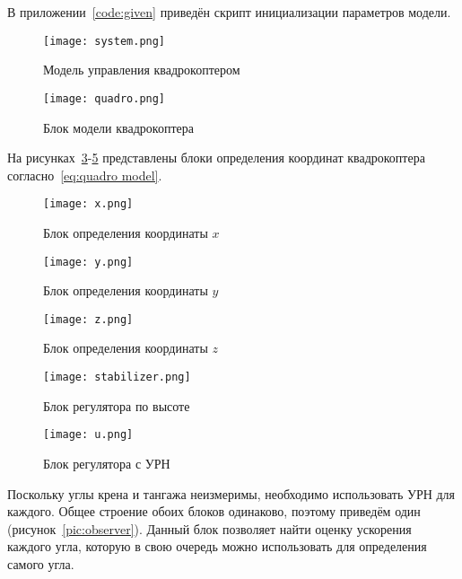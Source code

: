 \documentclass[14pt]{extarticle}
\begin{document}
    В приложении~\ref{code:given} приведён скрипт инициализации параметров модели.

    \begin{figure}[H]
        \centering
        \texttt{[image: system.png]}
        \caption{Модель управления квадрокоптером}
        \label{pic:system}
    \end{figure}

    \begin{figure}[H]
        \centering
        \texttt{[image: quadro.png]}
        \caption{Блок модели квадрокоптера}
        \label{pic:quadro}
    \end{figure}

    На рисунках~\ref{pic:x}-\ref{pic:z} представлены блоки определения координат квадрокоптера согласно~\eqref{eq:quadro model}.
    \begin{figure}[H]
        \centering
        \texttt{[image: x.png]}
        \caption{Блок определения координаты $x$}
        \label{pic:x}
    \end{figure}

    \begin{figure}[H]
        \centering
        \texttt{[image: y.png]}
        \caption{Блок определения координаты $y$}
        \label{pic:y}
    \end{figure}

    \begin{figure}[H]
        \centering
        \texttt{[image: z.png]}
        \caption{Блок определения координаты $z$}
        \label{pic:z}
    \end{figure}

    \begin{figure}[H]
        \centering
        \texttt{[image: stabilizer.png]}
        \caption{Блок регулятора по высоте}
        \label{pic:stab}
    \end{figure}

    \begin{figure}[H]
        \centering
        \texttt{[image: u.png]}
        \caption{Блок регулятора с УРН}
        \label{pic:u}
    \end{figure}

    Поскольку углы крена и тангажа неизмеримы, необходимо использовать УРН для каждого. Общее строение обоих блоков
    одинаково, поэтому приведём один (рисунок~\ref{pic:observer}). Данный блок позволяет найти оценку ускорения каждого
    угла, которую в свою очередь можно использовать для определения самого угла.
\end{document}
